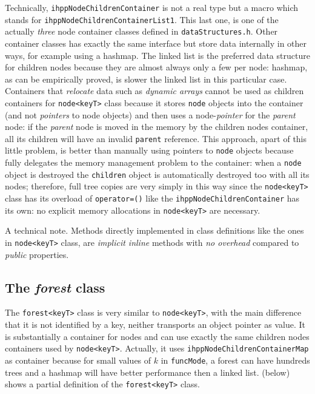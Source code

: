 \documentclass[a4paper,10pt]{report}
\begin{document}
\noindent
Technically, \verb|ihppNodeChildrenContainer| is not a real type but a macro which
stands for \verb|ihppNodeChildrenContainerList1|.
This last one, is one of the actually \emph{three} node container 
classes defined in \verb|dataStructures.h|. Other container classes
has exactly the same interface but store data internally in other ways,
for example using a hashmap. The linked list is the preferred data structure
for children nodes because they are almost always only a few per node: 
hashmap, as can be empirically proved, is slower the linked list 
in this particular case. Containers that \emph{relocate} data
such as \emph{dynamic arrays} cannot be used as children containers for \verb|node<keyT>|
class because it stores \verb|node| objects into the container (and not \emph{pointers} to node objects) and then uses a node-\emph{pointer} for the \emph{parent} node: 
if the \emph{parent} node is moved in the memory by the children nodes container,
all its children will have an invalid \verb|parent| reference. 
This approach, apart of this little problem, is better than manually using pointers 
to \verb|node| objects because fully delegates the memory management problem to the container: when a \verb|node| object is destroyed the \verb|children| object
is automatically destroyed too with all its nodes; therefore, full tree copies
are very simply in this way since the \verb|node<keyT>| class has its 
overload of \verb|operator=()| like the \verb|ihppNodeChildrenContainer| has its own:
no explicit memory allocations in \verb|node<keyT>| are necessary.

A technical note. Methods directly implemented in class definitions like
the ones in \verb|node<keyT>| class, are \emph{implicit inline} methods with
\emph{no overhead} compared to \emph{public} properties.

\subsection{The \emph{forest} class}

The \verb|forest<keyT>| class is very similar to \verb|node<keyT>|, with
the main difference that it is not identified by a key, neither transports
an object pointer as value. It is substantially a container 
for nodes and can use exactly the same children nodes containers used by \verb|node<keyT>|. Actually, it uses \verb|ihppNodeChildrenContainerMap| as container because for small values
of $k$ in \verb|funcMode|, a forest can have hundreds trees and a hashmap will have
better performance then a linked list. 
 (below) shows a partial definition of the \verb|forest<keyT>| class.
\end{document}
